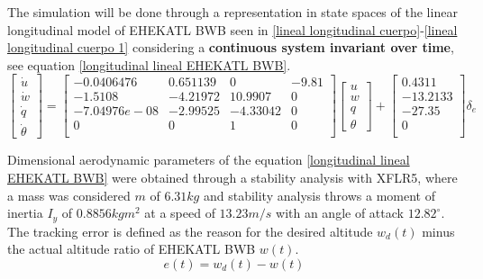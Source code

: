 The simulation will be done through a representation in state spaces of the linear longitudinal model of EHEKATL BWB seen in \ref{lineal longitudinal cuerpo}-\ref{lineal longitudinal cuerpo 1} considering a \textbf{continuous system invariant over time}, see equation \ref{longitudinal lineal EHEKATL BWB}.
\begin{equation}
\label{longitudinal lineal EHEKATL BWB}
    \begin{bmatrix}
        \dot u \\
        \dot w \\
        \dot q \\
        \dot \theta
    \end{bmatrix}
    =
    \begin{bmatrix}
    -0.0406476 & 0.651139 & 0 & -9.81 \\
    -1.5108 & -4.21972 & 10.9907 & 0 \\
    -7.04976e-08 & -2.99525 & -4.33042 & 0 \\
    0 & 0 & 1 & 0 \\
    \end{bmatrix}
    \begin{bmatrix}
        u \\
        w \\
        q \\
        \theta
    \end{bmatrix}
    +
    \begin{bmatrix}
    0.4311 \\
    -13.2133 \\
    -27.35 \\
    0\\
    \end{bmatrix}
    \delta_e
\end{equation}

Dimensional aerodynamic parameters of the equation \ref{longitudinal lineal EHEKATL BWB} were obtained through a stability analysis with XFLR5, where a mass was considered $m$ of $6.31kg$ and stability analysis throws a moment of inertia $I_y$ of $0.8856 kgm^2$ at a speed of $13.23m/s$ with an angle of attack $12.82^{\circ}$. The tracking error is defined as the reason for the desired altitude $w_d (t)$ minus the actual altitude ratio of EHEKATL BWB $ w(t)$. 
\begin{equation}
    e (t) = w_d (t) - w(t)
\end{equation}

